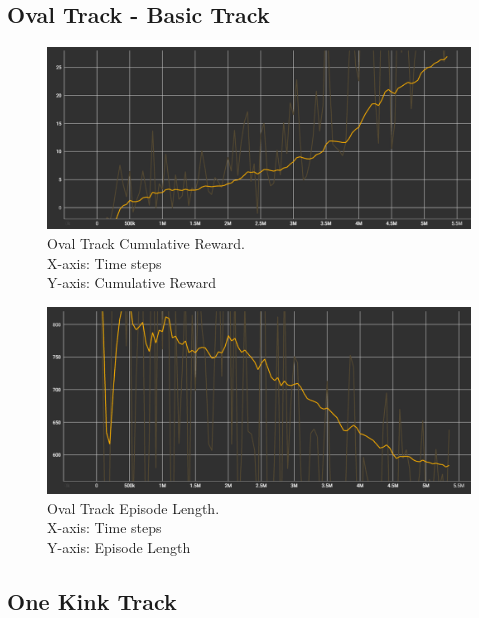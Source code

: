 \subsection{Oval Track - Basic Track}
\begin{figure}[H]
    \centering
    \includegraphics[width=1.0\textwidth]{images/graphs/OvalTrack-Reward.png}
    \caption{\centering Oval Track Cumulative Reward. \\ X-axis: Time steps \\ Y-axis: Cumulative Reward}
    \label{fig:rl}
\end{figure}
\begin{figure}[H]
    \centering
    \includegraphics[width=1.0\textwidth]{images/graphs/OvalTrack-Episode.png}
    \caption{\centering Oval Track Episode Length. \\ X-axis: Time steps \\ Y-axis: Episode Length}
    \label{fig:rl}
\end{figure}


\subsection{One Kink Track}

